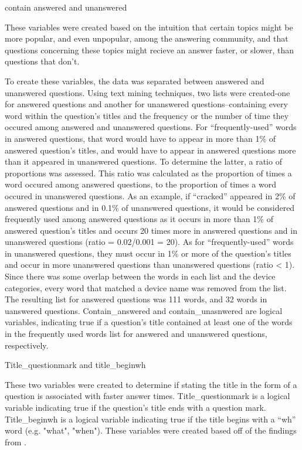 \documentclass[12pt]{article}
\begin{document}
contain answered and unanswered

  These variables were created based on the intuition that certain topics might be more popular, and even unpopular, among the answering community, and that questions concerning these topics might recieve an answer faster, or slower, than questions that don't. 
  
  To create these variables, the data was separated between answered and unanswered questions. Using text mining techniques, two lists were created-one for answered questions and another for unanswered questions--containing every word within the question's titles and the frequency or the number of time they occured among answered and unanswered questions. For ``frequently-used'' words in answered questions, that word would have to appear in more than 1\% of answered question's titles, and would have to appear in answered questions more than it appeared in unanswered questions. To determine the latter, a ratio of proportions was assessed. This ratio was calculated as the proportion of times a word occured among answered questions, to the proportion of times a word occured in unanswered questions. As an example, if ``cracked'' appeared in 2\% of answered questions and in 0.1\% of unanswered questions, it would be considered frequently used among answered questions as it occurs in more than 1\% of answered question's titles and occurs 20 times more in answered questions and in unanswered questions (ratio = 0.02/0.001 = 20). As for ``frequently-used'' words in unanswered questions, they must occur in 1\% or more of the question's titles and occur in more unanswered questions than unanswered questions (ratio < 1). Since there was some overlap between the words in each list and the device categories, every word that matched a device name was removed from the list. The resulting list for answered questions was 111 words, and 32 words in uanswered questions. Contain_answered and contain_unasnwered are logical variables, indicating true if a question's title contained at least one of the words in the frequently used words list for answered and unanswered questions, respectively. 
  
Title\_questionmark and title\_beginwh 

These two variables were created to determine if stating the title in the form of a question is associated with faster answer times. Title_questionmark is a logical variable indicating true if the question's title ends with a question mark. Title_beginwh is a logical variable indicating true if the title begins with a “wh” word (e.g. "what", "when"). These variables were created based off of the findings from \citep{Bhat2014}. 
  
\end{document}
